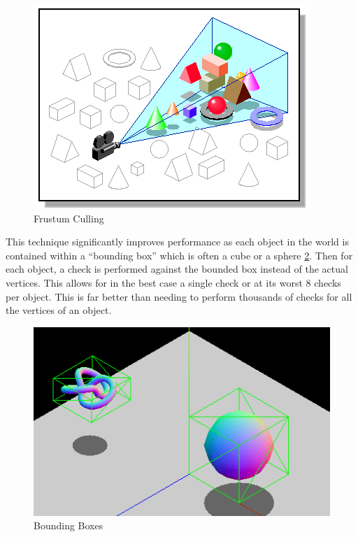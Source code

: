 \documentclass[11pt]{article}
\begin{document}
\begin{figure}[H]
  \centering
  \includegraphics[width=\textwidth]{images/frustum_culling.png}
  \caption{Frustum Culling \cite{frustum_culling}}
  \label{fig:frustum_culling}
\end{figure}


This technique significantly improves performance as each object in the world is
contained within a ``bounding box'' which is often a cube or a sphere
\ref{fig:bounding_boxes}. Then for each object, a check is performed against the
bounded box instead of the actual vertices. This allows for in the best case a
single check or at its worst 8 checks per object. This is far better than
needing to perform thousands of checks for all the vertices of an object.

\begin{figure}[H]
  \centering
  \includegraphics[width=\textwidth]{images/bounding_boxes.png}
  \caption{Bounding Boxes \cite{bounding_boxes}}
  \label{fig:bounding_boxes}
\end{figure}
\end{document}
